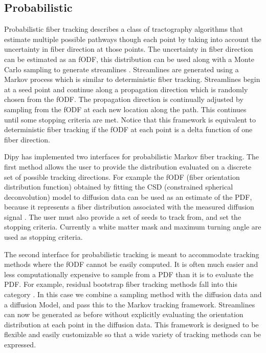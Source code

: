 \documentclass{bioinfo}
\begin{document}
\subsection{Probabilistic}

Probabilistic fiber tracking describes a class of tractography algorithms that
estimate multiple possible pathways though each point by taking into
account the uncertainty in fiber direction at those points. The uncertainty in
fiber direction can be estimated as an fODF, this distribution can be used along with a Monte Carlo sampling to
generate streamlines \citep{morris2008probabilistic}. Streamlines are generated using a
Markov process which is similar to deterministic fiber tracking. Streamlines begin
at a seed point and continue along a propagation direction which is randomly
chosen from the fODF. The propagation direction is continually adjusted by
sampling from the fODF at each new location along the path. This continues until
some stopping criteria are met. Notice that this framework is equivalent to
deterministic fiber tracking if the fODF at each point is a delta function of
one fiber direction.

Dipy has implemented two interfaces for probabilistic Markov fiber tracking. The
first method allows the user to provide the distribution evaluated on a discrete set of possible tracking directions. For example the fODF (fiber orientation distribution function)
obtained by fitting the CSD (constrained spherical deconvolution) model to diffusion
data can be used as an estimate of the PDF, because it represents a fiber distribution
associated with the measured diffusion signal \citep{jeurissen2011probabilistic}. The user must
also provide a set of seeds to track from, and set the stopping criteria. Currently a white matter mask and maximum turning angle are used as stopping criteria.

The second interface for probabilistic tracking is meant to accommodate tracking
methods where the fODF cannot be easily computed. It is often much easier and less
computationally expensive to sample from a PDF than it is to evaluate the PDF. For
example, residual bootstrap fiber tracking methods fall into this category \citep{berman2008probabilistic}.
In this case we combine a sampling method with the diffusion data and a diffusion Model,
and pass this to the Markov tracking framework. Streamlines can now be generated
as before without explicitly evaluating the orientation distribution at each
point in the diffusion data. This framework is designed to be flexible and easily
customizable so that a wide variety of tracking methods can be expressed.
\end{document}

